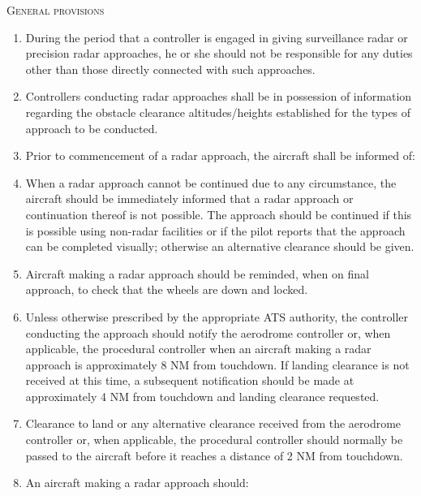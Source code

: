 \begin{enumeratesc}
    \item \textsc{General provisions}
    \begin{enumerate}
        \item During the period that a controller is engaged in giving surveillance radar or precision radar approaches, he or she should not be responsible for any duties other than those directly connected with such approaches.
        \item Controllers conducting radar approaches shall be in possession of information regarding the obstacle clearance altitudes/heights established for the types of approach to be conducted.
        \item Prior to commencement of a radar approach, the aircraft shall be informed of:
        

        \item When a radar approach cannot be continued due to any circumstance, the aircraft should be immediately informed that a radar approach or continuation thereof is not possible. The approach should be continued if this is possible using non-radar facilities or if the pilot reports that the approach can be completed visually; otherwise an alternative clearance should be given.
        \item Aircraft making a radar approach should be reminded, when on final approach, to check that the wheels are down and locked.
        \item Unless otherwise prescribed by the appropriate ATS authority, the controller conducting the approach should notify the aerodrome controller or, when applicable, the procedural controller when an aircraft making a radar approach is approximately 8 NM from touchdown. If landing clearance is not received at this time, a subsequent notification should be made at approximately 4 NM from touchdown and landing clearance requested.
        \item Clearance to land or any alternative clearance received from the aerodrome controller or, when applicable, the procedural controller should normally be passed to the aircraft before it reaches a distance of 2 NM from touchdown.
        \item \label{8.9.6.1.8} An aircraft making a radar approach should:
        

\end{enumerate}
\end{enumeratesc}
